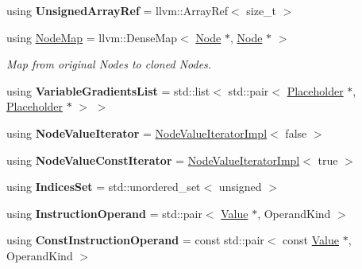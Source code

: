 \begin{DoxyCompactItemize}
using {\bfseries Unsigned\+Array\+Ref} = llvm\+::\+Array\+Ref$<$ size\+\_\+t $>$
\item 
\mbox{\label{namespaceglow_afe305f16778f20f331d6b2016221a756}} 
using \hyperlink{namespaceglow_afe305f16778f20f331d6b2016221a756}{Node\+Map} = llvm\+::\+Dense\+Map$<$ \hyperlink{classglow_1_1_node}{Node} $\ast$, \hyperlink{classglow_1_1_node}{Node} $\ast$ $>$
\begin{DoxyCompactList}\small\item\em Map from original Nodes to cloned Nodes. \end{DoxyCompactList}\item 
\mbox{\label{namespaceglow_ac90b70bdd9c7f0b464aab1f5052ba32f}} 
using {\bfseries Variable\+Gradients\+List} = std\+::list$<$ std\+::pair$<$ \hyperlink{classglow_1_1_placeholder}{Placeholder} $\ast$, \hyperlink{classglow_1_1_placeholder}{Placeholder} $\ast$ $>$ $>$
\item 
\mbox{\label{namespaceglow_a27f95b663529f09dd2ec740fa7de7651}} 
using {\bfseries Node\+Value\+Iterator} = \hyperlink{classglow_1_1_node_value_iterator_impl}{Node\+Value\+Iterator\+Impl}$<$ false $>$
\item 
\mbox{\label{namespaceglow_a85803b3c7a157b062a37bc07816963a1}} 
using {\bfseries Node\+Value\+Const\+Iterator} = \hyperlink{classglow_1_1_node_value_iterator_impl}{Node\+Value\+Iterator\+Impl}$<$ true $>$
\item 
\mbox{\label{namespaceglow_a29fbdb5f438570d27e0c0b661b58b03e}} 
using {\bfseries Indices\+Set} = std\+::unordered\+\_\+set$<$ unsigned $>$
\item 
\mbox{\label{namespaceglow_a2e94ce06bbb6343779020891e28a7058}} 
using {\bfseries Instruction\+Operand} = std\+::pair$<$ \hyperlink{classglow_1_1_value}{Value} $\ast$, Operand\+Kind $>$
\item 
\mbox{\label{namespaceglow_afe0dc15599ae28d8556999c9cf2a2643}} 
using {\bfseries Const\+Instruction\+Operand} = const std\+::pair$<$ const \hyperlink{classglow_1_1_value}{Value} $\ast$, Operand\+Kind $>$
\item 
\mbox{\label{namespaceglow_ab49ee75ee62d0543c929b88397878709}} 

\end{DoxyCompactItemize}
